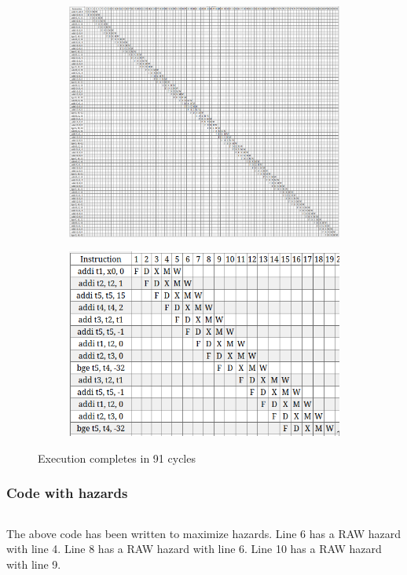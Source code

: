 \documentclass[11pt]{article}
\newenvironment{codeblock}{\captionsetup{type=codelisting}}{}
\begin{document}
\begin{figure}[H]
\begin{subfigure}{.5\textwidth}
  \centering
  \includegraphics[width=\linewidth]{q1/nox/good/full-91.png}
\end{subfigure}
\begin{subfigure}{.5\textwidth}
  \centering
  \includegraphics[width=\linewidth]{q1/nox/good/loop.png}
\end{subfigure}
\caption{Execution completes in 91 cycles}
\end{figure}

\newpage

\subsubsection{Code with hazards}
\begin{codeblock}
\inputminted[breaklines,
 mathescape,
 linenos,
 numbersep=5pt,
 frame=single,
 xleftmargin=0pt]{asm}{q1/fib-nobdex-bad.S}
\end{codeblock}
The above code has been written to maximize hazards. Line 6 has a RAW hazard with line 4. Line 8 has a RAW hazard with line 6. Line 10 has a RAW hazard with line 9.
\end{document}
